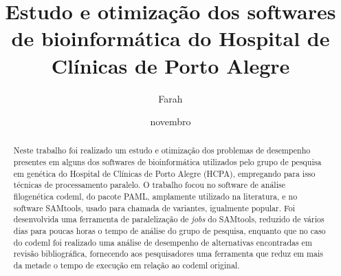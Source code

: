 \documentclass[cic,tc]{iiufrgs}
\title{Estudo e otimização dos softwares de bioinformática do Hospital de
Clínicas de Porto Alegre}
\author{Farah}{Alef}
\date{novembro}{2021}
\begin{document}
\maketitle



\begin{abstract}
  Neste trabalho foi realizado um estudo e otimização dos problemas de
  desempenho presentes em alguns dos softwares de bioinformática utilizados
  pelo grupo de pesquisa em genética do Hospital de Clínicas de Porto Alegre
  (HCPA), empregando para isso técnicas de processamento paralelo. O trabalho
  focou no software de análise filogenética codeml, do pacote PAML, amplamente
  utilizado na literatura, e no software SAMtools, usado para chamada de
  variantes, igualmente popular. Foi desenvolvida uma ferramenta de
  paralelização de \textit{jobs} do SAMtools, reduzido de vários dias para
  poucas horas o tempo de análise do grupo de pesquisa, enquanto que no caso do
  codeml foi realizado uma análise de desempenho de alternativas encontradas em
  revisão bibliográfica, fornecendo aos pesquisadores uma ferramenta que reduz
  em mais da metade o tempo de execução em relação ao codeml original.
  \end{abstract}
\end{document}
